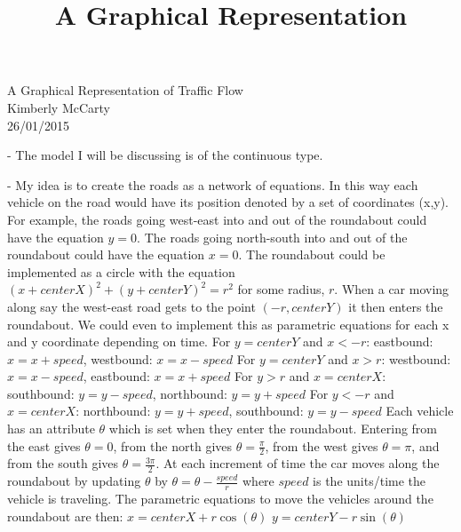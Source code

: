 \documentclass[a4paper]{article}
\title{A Graphical Representation
}
\begin{document}
\begin{center}
\LARGE{A Graphical Representation of Traffic Flow}\\
\large{Kimberly McCarty}\\
\large{26/01/2015}
\end{center}

\vspace{.5cm}\noindent- The model I will be discussing is of the continuous type.

\vspace{.5cm}
\noindent- My idea is to create the roads as a network of equations. In this way each vehicle on the road would have its position denoted by a set of coordinates (x,y). For example, the roads going west-east into and out of the roundabout could have the equation $y=0$. The roads going north-south into and out of the roundabout could have the equation $x=0$. The roundabout could be implemented as a circle with the equation $(x+centerX)^2+(y+centerY)^2=r^2$ for some radius, $r$. When a car moving along say the west-east road gets to the point $(-r,centerY)$ it then enters the roundabout. 
\newline We could even to implement this as parametric equations for each x and y coordinate depending on time.
\newline For $y=centerY$ and $x<-r$: eastbound: $x=x+speed$, westbound: $x=x-speed$
\newline For $y=centerY$ and $x>r$: westbound: $x=x-speed$, eastbound: $x=x+speed$
\newline For $y>r$ and $x=centerX$: southbound: $y=y-speed$, northbound: $y=y+speed$
\newline For $y<-r$ and $x=centerX$: northbound: $y=y+speed$, southbound: $y=y-speed$
\newline Each vehicle has an attribute $\theta$ which is set when they enter the roundabout. Entering from the east gives $\theta=0$, from the north gives $\theta=\frac{\pi}{2}$, from the west gives $\theta=\pi$, and from the south gives $\theta=\frac{3\pi}{2}$. At each increment of time the car moves along the roundabout by updating $\theta$ by $\theta=\theta-\frac{speed}{r}$ where  $speed$ is the units/time the vehicle is traveling. The parametric equations to move the vehicles around the roundabout are then:
\newline $x=centerX+r\cos(\theta)$
\newline $y=centerY-r\sin(\theta)$
\end{document}
